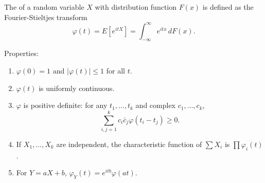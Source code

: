 The  of a random variable $X$ with distribution function $F(x)$ is defined as the Fourier-Stieltjes transform
$$\varphi(t) = E[e^{itX}] = \int_{-\infty}^{\infty} e^{itx} \, dF(x).$$

Properties:
\begin{enumerate}
\item $\varphi(0) = 1$ and $|\varphi(t)| \leq 1$ for all $t$.
\item $\varphi(t)$ is uniformly continuous.
\item $\varphi$ is positive definite: for any $t_1, \ldots, t_k$ and complex $c_1, \ldots, c_k$,
  $$\sum_{i,j=1}^{k} c_i \bar{c}_j \varphi(t_i - t_j) \geq 0.$$
\item If $X_1, \ldots, X_k$ are independent, the characteristic function of $\sum X_i$ is $\prod \varphi_i(t)$.
\item For $Y = aX + b$, $\varphi_Y(t) = e^{itb} \varphi(at)$.
\end{enumerate}
